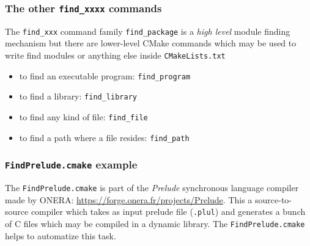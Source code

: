 \documentclass[compress,slidestop,table
              ]
               {beamer}
\newcommand{\fname}[1]{\texttt{#1}}
\begin{document}
\begin{frame}[fragile]
\frametitle{The other \lstinline!find_xxxx! commands}
\begin{block}{The \lstinline!find_xxx! command family}
\lstinline!find_package! is a \emph{high level} module finding mechanism
but there are lower-level CMake commands which may be used to write
find modules or anything else inside \fname{CMakeLists.txt}
\end{block}
\begin{itemize}
\item to find an executable program: \lstinline!find_program!
\item to find a library: \lstinline!find_library!
\item to find any kind of file: \lstinline!find_file!
\item to find a path where a file resides: \lstinline!find_path!
\end{itemize}
\end{frame}

\begin{frame}
  \frametitle{\texttt{FindPrelude.cmake} example}

  The \texttt{FindPrelude.cmake} is part of the \emph{Prelude} synchronous language compiler made by ONERA:
  \url{https://forge.onera.fr/projects/Prelude}. This a source-to-source compiler which takes as input prelude file (\texttt{.plul}) and generates a bunch of C files which may be compiled in a dynamic library. The \texttt{FindPrelude.cmake} helps to automatize this task.

  
\end{frame}
\end{document}
